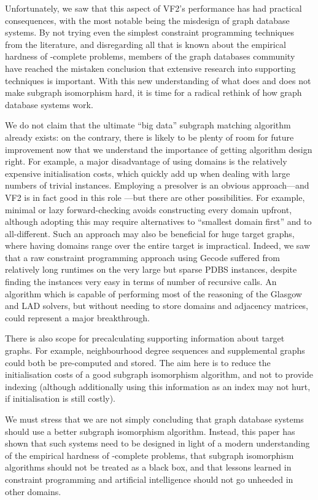 \documentclass[twoside,11pt]{article}
\begin{document}
Unfortunately, we saw that this aspect of VF2's performance has had practical consequences, with the
most notable being the misdesign of graph database systems. By not trying even the simplest constraint
programming techniques from the literature, and disregarding all that is known about the empirical
hardness of \NP-complete problems, members of the graph databases community have reached the mistaken
conclusion that extensive research into supporting techniques is important. With this new
understanding of what does and does not make subgraph isomorphism hard, it is time for a radical
rethink of how graph database systems work.

We do not claim that the ultimate ``big data'' subgraph matching algorithm already exists:
on the contrary, there is likely to be plenty of room for future improvement now that we understand
the importance of getting algorithm design right.  For example, a major disadvantage of using
domains is the relatively expensive initialisation costs, which quickly add up when dealing with
large numbers of trivial instances. Employing a presolver is an obvious approach---and VF2 is
in fact good in this role \cite{DBLP:conf/lion/KotthoffMS16}---but there are other possibilities.
For example, minimal or lazy forward-checking
\cite{DBLP:conf/ictai/DentM94,DBLP:conf/cp/BacchusG95,o:Dent96,DBLP:conf/ecai/LarrosaM98} avoids
constructing every domain upfront, although adopting this may require alternatives to ``smallest domain
first'' and to all-different. Such an approach may also be beneficial for huge target graphs, where
having domains range over the entire target is impractical. Indeed, we saw that a raw constraint
programming approach using Gecode suffered from relatively long runtimes on the very large but
sparse PDBS instances, despite finding the instances very easy in terms of number of recursive
calls. An algorithm which is capable of performing most of the reasoning of the Glasgow and LAD
solvers, but without needing to store domains and adjacency matrices, could represent a major
breakthrough.

There is also scope for precalculating supporting information about target graphs. For example,
neighbourhood degree sequences and supplemental graphs could both be pre-computed and stored. The aim
here is to reduce the initialisation costs of a good subgraph isomorphism algorithm, and not to
provide indexing (although additionally using this information as an index may not hurt, if
initialisation is still costly).

We must stress that we are not simply concluding that graph database systems should use a better
subgraph isomorphism algorithm.  Instead, this paper has shown that such systems need to be designed
in light of a modern understanding of the empirical hardness of \NP-complete problems, that subgraph
isomorphism algorithms should not be treated as a black box, and that lessons learned in constraint
programming and artificial intelligence should not go unheeded in other domains.
\end{document}
